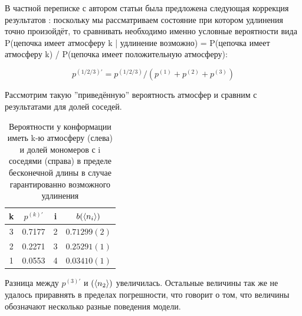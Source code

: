 В частной переписке с автором статьи была предложена следующая коррекция результатов \cite{web:PrellbergPrivate}: поскольку мы рассматриваем состояние при котором удлинения точно произойдёт, то сравнивать необходимо именно условные вероятности вида P({цепочка имеет атмосферу k | удлинение возможно}) = P({цепочка имеет атмосферу k}) / P({цепочка имеет положительную атмосферу}):

\begin{equation*}
    p^{(1/2/3)'} = p^{(1/2/3)} / (p^{(1)} + p^{(2)} + p^{(3)})
\end{equation*}

Рассмотрим такую ''приведённую'' вероятность атмосфер и сравним с результатами для долей соседей.

\begin{table}[h]
    \centering
    \begin{tabular}{|c|c|c|c|}
    \hline
    k & $p^{(k)'}$ & i & $b(\langle n_{i} \rangle)$ \\ \hline
    3 & 0.7177 & 2 & $0.71299(2)$ \\ \hline
    2 & 0.2271 & 3 & $0.25291(1)$ \\ \hline
    1 & 0.0553 & 4 & $0.03410(1)$\\ \hline
    \end{tabular}
    \caption{Вероятности у конформации иметь k-ю атмосферу (слева) и долей мономеров с i соседями (справа) в пределе бесконечной длины в случае гарантированно возможного удлинения}
    \label{tab:Prellb_Compare2}
\end{table}

Разница между $p^{(3)'}$ и $(\langle n_{2} \rangle)$ увеличилась. Остальные величины так же не удалось приравнять в пределах погрешности, что говорит о том, что величины обозначают несколько разные поведения модели.



